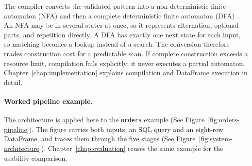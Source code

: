 The compiler converts the validated pattern into a non-deterministic
finite automaton (NFA) and then a complete deterministic finite
automaton (DFA)~\cite{HopcroftUllman}.  An NFA may be in several
states at once, so it represents alternation, optional parts, and
repetition directly.  A DFA has exactly one next state for each input,
so matching becomes a lookup instead of a search.  The conversion
therefore trades construction cost for a predictable scan.  If
complete construction exceeds a resource limit, compilation fails
explicitly; it never executes a partial automaton.  Chapter~\ref{chap:implementation}
explains compilation and DataFrame execution in detail.

\paragraph{Worked pipeline example.}
\label{subsec:meth-worked-pipeline}
The architecture is applied here to the \texttt{orders} example (See
Figure~\ref{fig:orders-pipeline}).  The figure carries both inputs, an SQL query
and an
eight-row DataFrame, and traces them through the five stages (See
Figure~\ref{fig:system-architecture}).
Chapter~\ref{chap:evaluation} reuses the same example for the
usability comparison.


